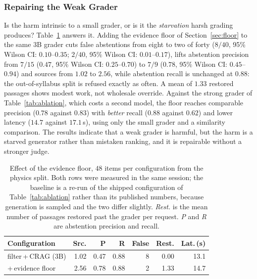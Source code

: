 \documentclass[conference]{IEEEtran}
\begin{document}
\subsubsection{Repairing the Weak Grader}
\label{sec:flooreval}
Is the harm intrinsic to a small grader, or is it the \emph{starvation} harsh
grading produces? Table~\ref{tab:floor} answers it. Adding the evidence floor of
Section~\ref{sec:floor} to the same $3$B grader cuts false abstentions from
eight to two of forty ($8/40$, 95\% Wilson CI: $0.10$--$0.35$;
$2/40$, 95\% Wilson CI: $0.01$--$0.17$), lifts abstention precision
from $7/15$ ($0.47$, 95\% Wilson CI: $0.25$--$0.70$) to $7/9$
($0.78$, 95\% Wilson CI: $0.45$--$0.94$) and sources from $1.02$ to $2.56$,
while abstention recall is unchanged at $0.88$: the out-of-syllabus split is
refused exactly as often. A mean of $1.33$ restored passages shows modest work,
not wholesale override. Against the strong grader of
Table~\ref{tab:ablation}, which costs a second model, the floor reaches
comparable precision ($0.78$ against $0.83$) with \emph{better} recall ($0.88$
against $0.62$) and lower latency ($14.7$ against $17.1$\,s), using only the
small grader and a similarity comparison. The results indicate that a weak
grader is harmful, but the harm is a starved generator rather than mistaken
ranking, and it is repairable without a stronger judge.

\begin{table}[htbp]
\caption{Effect of the evidence floor, $48$ items per configuration from the
physics split. Both rows were measured in the same session; the baseline is a
re-run of the shipped configuration of Table~\ref{tab:ablation} rather than its
published numbers, because generation is sampled and the two differ slightly.
\emph{Rest.} is the mean number of passages restored past the grader per
request. \emph{P} and \emph{R} are abstention precision and recall.}
\label{tab:floor}
\centering
\small
\setlength{\tabcolsep}{4pt}
\begin{tabular}{@{}lrrrrrr@{}}
\toprule
\textbf{Configuration} & \textbf{Src.} & \textbf{P} & \textbf{R} & \textbf{False} & \textbf{Rest.} & \textbf{Lat.\,(s)} \\
\midrule
filter\,+\,CRAG ($3$B) & 1.02 & 0.47 & 0.88 & 8 & 0.00 & 13.1 \\
\quad +\,evidence floor & 2.56 & 0.78 & 0.88 & 2 & 1.33 & 14.7 \\
\bottomrule
\end{tabular}
\end{table}
\end{document}
